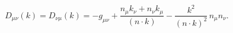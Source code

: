\begin{equation}
D_{\mu\nu}(k)= D_{\nu\mu}(k)= -g_{\mu\nu} + \frac
{n_{\mu}k_{\nu}+n_{\nu}k_{\mu}}{(n\cdot k)} - \frac {k^{2}}
{(n\cdot k)^{2}} \, n_{\mu}n_{\nu}.
\end{equation}

